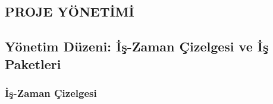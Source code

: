 \documentclass[a4paper]{article}
\begin{document}
\begin{landscape}
\thispagestyle{mylandscape}

\section{PROJE YÖNETİMİ} 

\subsection{Yönetim Düzeni: İş-Zaman Çizelgesi ve İş Paketleri}

\subsubsection{İş-Zaman Çizelgesi}



\end{landscape}
\end{document}
